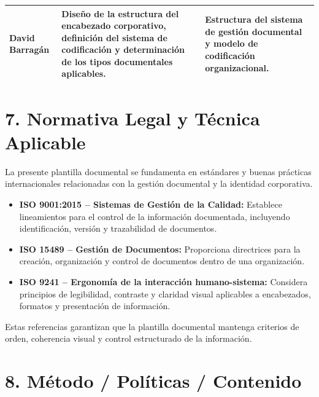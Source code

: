 \documentclass{encabezado}
\begin{document}
\begin{center}
\begin{tabular}{p{3cm} p{7cm} p{4cm}}
        \hline
        David Barragán                                                                                                                                                                            &
        Diseño de la estructura del encabezado corporativo, definición del sistema de codificación y determinación de los tipos documentales aplicables.                                          &
        Estructura del sistema de gestión documental y modelo de codificación organizacional.                                                                                                                                                                        \\
        \hline
    \end{tabular}
\end{center}

\section*{7. Normativa Legal y Técnica Aplicable}

La presente plantilla documental se fundamenta en estándares y buenas prácticas internacionales relacionadas con la gestión documental y la identidad corporativa.

\begin{itemize}
    \item \textbf{ISO 9001:2015 – Sistemas de Gestión de la Calidad:}
          Establece lineamientos para el control de la información documentada, incluyendo identificación, versión y trazabilidad de documentos.

    \item \textbf{ISO 15489 – Gestión de Documentos:}
          Proporciona directrices para la creación, organización y control de documentos dentro de una organización.

    \item \textbf{ISO 9241 – Ergonomía de la interacción humano-sistema:}
          Considera principios de legibilidad, contraste y claridad visual aplicables a encabezados, formatos y presentación de información.
\end{itemize}

Estas referencias garantizan que la plantilla documental mantenga criterios de orden, coherencia visual y control estructurado de la información.

\section*{8. Método / Políticas / Contenido}
\end{document}
